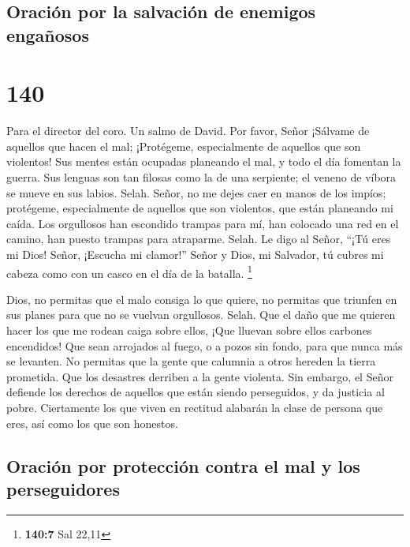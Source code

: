 \hypertarget{oraciuxf3n-por-la-salvaciuxf3n-de-enemigos-engauxf1osos}{%
\subsection{Oración por la salvación de enemigos
engañosos}\label{oraciuxf3n-por-la-salvaciuxf3n-de-enemigos-engauxf1osos}}

\hypertarget{section-139}{%
\section{140}\label{section-139}}

Para el director del coro. Un salmo de David.  Por favor,
Señor ¡Sálvame de aquellos que hacen el mal; ¡Protégeme, especialmente
de aquellos que son violentos!  Sus mentes están ocupadas
planeando el mal, y todo el día fomentan la guerra.  Sus
lenguas son tan filosas como la de una serpiente; el veneno de víbora se
mueve en sus labios. Selah.  Señor, no me dejes caer en
manos de los impíos; protégeme, especialmente de aquellos que son
violentos, que están planeando mi caída.  Los orgullosos han
escondido trampas para mí, han colocado una red en el camino, han puesto
trampas para atraparme. Selah.  Le digo al Señor, ``¡Tú eres
mi Dios! Señor, ¡Escucha mi clamor!''  Señor y Dios, mi
Salvador, tú cubres mi cabeza como con un casco en el día de la batalla.
\footnote{\textbf{140:7} Sal 22,11}

 Dios, no permitas que el malo consiga lo que quiere, no
permitas que triunfen en sus planes para que no se vuelvan orgullosos.
Selah.  Que el daño que me quieren hacer los que me rodean
caiga sobre ellos,  ¡Que lluevan sobre ellos carbones
encendidos! Que sean arrojados al fuego, o a pozos sin fondo, para que
nunca más se levanten.  No permitas que la gente que
calumnia a otros hereden la tierra prometida. Que los desastres derriben
a la gente violenta.  Sin embargo, el Señor defiende los
derechos de aquellos que están siendo perseguidos, y da justicia al
pobre.  Ciertamente los que viven en rectitud alabarán la
clase de persona que eres, así como los que son honestos.

\hypertarget{oraciuxf3n-por-protecciuxf3n-contra-el-mal-y-los-perseguidores}{%
\subsection{Oración por protección contra el mal y los
perseguidores}\label{oraciuxf3n-por-protecciuxf3n-contra-el-mal-y-los-perseguidores}}

